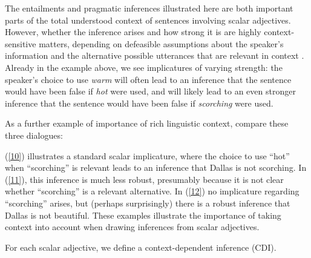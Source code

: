 \documentclass[10pt]{article}
\begin{document}
 \vspace{-.05in}
The entailments and pragmatic inferences illustrated here are both important parts of the total understood context of sentences involving scalar adjectives. However, whether the inference arises and how strong it is are highly context-sensitive matters, depending on defeasible assumptions about the speaker's information and the alternative possible utterances that are relevant in context \cite{hirschberg1991theory,frank2012predicting,goodman2013knowledge}. Already in the example above, we see implicatures of varying strength: the speaker's choice to use \emph{warm} will often lead to an inference that the sentence would have been false if \emph{hot} were used, and will likely lead to an even stronger inference that the sentence would have been false if \emph{scorching} were used. 

As a further example of importance of rich linguistic context, compare these three dialogues: 
 \vspace{-.1in}
\begin{multicols}{3}
\end{multicols}
 \vspace{-.1in}
\noindent
(\ref{10}) illustrates a standard scalar implicature, where the choice to use ``hot'' when ``scorching'' is relevant leads to an inference that Dallas is not scorching. In (\ref{11}), this inference is much less robust, presumably because it is not clear whether ``scorching'' is a relevant alternative. In (\ref{12}) no implicature regarding ``scorching'' arises, but (perhaps surprisingly) there is a robust inference that Dallas is not beautiful. These examples illustrate the importance of taking context into account when drawing inferences from scalar adjectives. 

For each scalar adjective, we define a context-dependent inference (CDI). 

\vspace{-0.5em}
\end{document}
